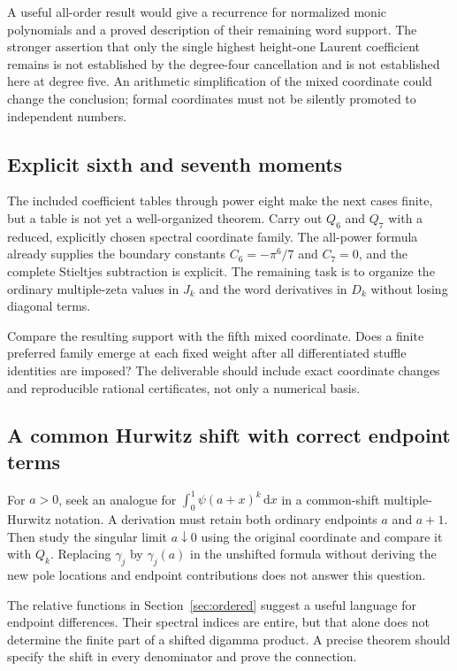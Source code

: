 \documentclass[11pt,a4paper]{article}
\numberwithin{equation}{section}
\theoremstyle{definition}
\theoremstyle{remark}
\newcommand{\dd}{\mathrm d}
\begin{document}
A useful all-order result would give a recurrence for normalized
monic polynomials and a proved description of their remaining word
support.  The stronger assertion that only the single highest
height-one Laurent coefficient remains is not established by the
degree-four cancellation and is not established here at degree five.
An arithmetic simplification of the mixed coordinate could change
the conclusion; formal coordinates must not be silently promoted to
independent numbers.

\subsection{Explicit sixth and seventh moments}

The included coefficient tables through power eight make the next
cases finite, but a table is not yet a well-organized theorem.
Carry out $Q_6$ and $Q_7$ with a reduced, explicitly chosen spectral
coordinate family.  The all-power formula already supplies the
boundary constants $C_6=-\pi^6/7$ and $C_7=0$, and the complete
Stieltjes subtraction is explicit.  The remaining task is to organize
the ordinary multiple-zeta values in $J_k$ and the word derivatives
in $D_k$ without losing diagonal terms.

Compare the resulting support with the fifth mixed coordinate.
Does a finite preferred family emerge at each fixed weight after
all differentiated stuffle identities are imposed?  The deliverable
should include exact coordinate changes and reproducible rational
certificates, not only a numerical basis.

\subsection{A common Hurwitz shift with correct endpoint terms}

For $a>0$, seek an analogue for
$\int_0^1\psi(a+x)^k\,\dd x$ in a common-shift multiple-Hurwitz
notation.  A derivation must retain both ordinary endpoints
$a$ and $a+1$.  Then study the singular limit $a\downarrow0$
using the original coordinate and compare it with $Q_k$.
Replacing $\gamma_j$ by $\gamma_j(a)$ in the unshifted formula
without deriving the new pole locations and endpoint contributions
does not answer this question.

The relative functions in Section~\ref{sec:ordered} suggest a useful
language for endpoint differences.  Their spectral indices are
entire, but that alone does not determine the finite part of a
shifted digamma product.  A precise theorem should specify the
shift in every denominator and prove the connection.
\end{document}
